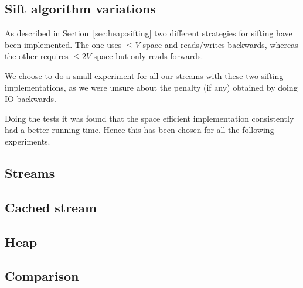 
\subsection{Sift algorithm variations}
As described in Section~\ref{sec:heap:sifting} two different strategies for sifting have been implemented. The one uses $\leq V$ space and reads/writes backwards, whereas the other requires $\leq 2V$ space but only reads forwards.

We choose to do a small experiment for all our streams with these two sifting implementations, as we were unsure about the penalty (if any) obtained by doing IO backwards.

Doing the tests it was found that the space efficient implementation consistently had a better running time. Hence this has been chosen for all the following experiments.

\subsection{Streams}


\subsection{Cached stream}

\subsection{Heap}


\subsection{Comparison}